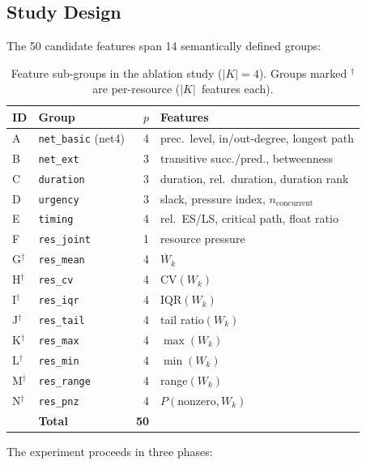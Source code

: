\subsection{Study Design}
\label{subsec:ablation_design}
The 50 candidate features span 14 semantically defined groups:
\begin{table}[htbp]
\centering
\renewcommand{\arraystretch}{1.30}
\caption{Feature sub-groups in the ablation study ($|K|=4$).
         Groups marked $^{\dagger}$ are per-resource
         ($|K|$~features each).}
\label{tab:ablation_feature_groups}
\begin{tabular}{l l r l}
\hline
\textbf{ID} & \textbf{Group} & $p$ & \textbf{Features} \\
\hline
A & \texttt{net\_basic} (net4)   & 4 & prec.\ level, in/out-degree, longest path \\
B & \texttt{net\_ext}            & 3 & transitive succ./pred., betweenness \\
C & \texttt{duration}            & 3 & duration, rel.\ duration, duration rank \\
D & \texttt{urgency}             & 3 & slack, pressure index, $n_{\text{concurrent}}$ \\
E & \texttt{timing}              & 4 & rel.\ ES/LS, critical path, float ratio \\
F & \texttt{res\_joint}          & 1 & resource pressure \\
G$^{\dagger}$ & \texttt{res\_mean}  & 4 & $\overline{W}_k$ \\
H$^{\dagger}$ & \texttt{res\_cv}    & 4 & $\mathrm{CV}(W_k)$ \\
I$^{\dagger}$ & \texttt{res\_iqr}   & 4 & $\mathrm{IQR}(W_k)$ \\
J$^{\dagger}$ & \texttt{res\_tail}  & 4 & tail ratio$(W_k)$ \\
K$^{\dagger}$ & \texttt{res\_max}   & 4 & $\max(W_k)$ \\
L$^{\dagger}$ & \texttt{res\_min}   & 4 & $\min(W_k)$ \\
M$^{\dagger}$ & \texttt{res\_range} & 4 & range$(W_k)$ \\
N$^{\dagger}$ & \texttt{res\_pnz}   & 4 & $P(\text{nonzero},W_k)$ \\
\hline
 & \textbf{Total}              & \textbf{50} & \\
\hline
\end{tabular}
\end{table}
\noindent
The experiment proceeds in three phases:
